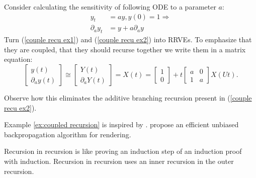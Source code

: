 \documentclass[a4paper,12pt]{article}
\begin{document}
\begin{example} \label{ex:coupled recursion}
    Consider calculating the
    sensitivity of following ODE to a
    parameter $a$:
    \begin{align}
        y_t             & =ay,y(0)=1 \Rightarrow \label{couple recu ex1} \\
        \partial_{a}y_t & = y + a \partial_{a}y \label{couple recu ex2}
    \end{align}
    Turn (\ref{couple recu ex1}) and (\ref{couple recu ex2}) into RRVEs.
    To emphasize that they are coupled, that they should
    recurse together we write them in a matrix equation:
    \begin{equation} \label{coupled mat}
        \begin{bmatrix}
            y(t) \\
            \partial_{a}y(t)
        \end{bmatrix} \cong
        \begin{bmatrix}
            Y(t) \\
            \partial_{a}Y(t)
        \end{bmatrix}=
        X(t)=
        \begin{bmatrix}
            1 \\
            0
        \end{bmatrix}+
        t \begin{bmatrix}
            a & 0 \\
            1 & a
        \end{bmatrix}
        X(Ut).
    \end{equation}

    Observe how this eliminates the additive branching recursion
    present in (\ref{couple recu ex2}).

\end{example}

\begin{pythonn} 
\end{pythonn}

\begin{related}
    Example \ref{ex:coupled recursion} is inspired by \cite{vicini_path_2021}.
    \cite{vicini_path_2021} propose an efficient unbiased backpropagation
    algorithm for rendering.
\end{related}

\begin{technique}\label{tech:recu in recu}
    Recursion in recursion is like proving an induction
    step of an induction proof with induction. Recursion in recursion
    uses an inner recursion in the outer recursion.
\end{technique}
\end{document}
